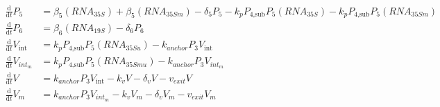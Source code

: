 \documentclass[fontsize=9pt,letter]{scrartcl}
\numberwithin{equation}{section} %
\numberwithin{figure}{section} %
\numberwithin{table}{section} %
\begin{document}
\begin{align}
%
\frac{\mathrm{d}}{\mathrm{d} t} P_5 &= \beta_5 (RNA_{35S}) + \beta_5 (RNA_{35Sm}) - \delta_5 P_5 - k_p P_{4 \text{,sub}} P_5 (RNA_{35S}) - k_p P_{4 \text{,sub}} P_5 (RNA_{35Sm}) \\
%
\frac{\mathrm{d}}{\mathrm{d} t} P_6 &= \beta_6 (RNA_{19S}) - \delta_6 P_6 \\
%
\frac{\mathrm{d}}{\mathrm{d} t} V_{\text{int}} &= k_p P_{4 \text{,sub}} P_5 (RNA_{35Su}) - k_{anchor} P_3 V_{\text{int}} \\
%
\frac{\mathrm{d}}{\mathrm{d} t} V_{int_m} &= k_p P_{4 \text{,sub}} P_5 (RNA_{35Smu}) - k_{anchor} P_3 V_{int_m} \\
%
\frac{\mathrm{d}}{\mathrm{d} t} V &= k_{anchor} P_3 V_{\text{int}} - k_v V - \delta_v V - v_{exit} V \\
%
\frac{\mathrm{d}}{\mathrm{d} t} V_m &= k_{anchor} P_3 V_{int_m} - k_v V_m - \delta_v V_m - v_{exit} V_m
\end{align}



\end{document}
